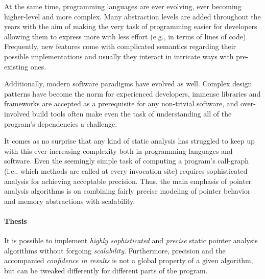 At the same time, programming languages are ever evolving, ever becoming higher-level and more complex. Many abstraction levels are added throughout the years with the aim of making the very task of programming easier for developers allowing them to express more with less effort (e.g., in terms of lines of code). Frequently, new features come with complicated semantics regarding their possible implementations and usually they interact in intricate ways with pre-existing ones.

Additionally, modern software paradigms have evolved as well. Complex design patterns have become the norm for experienced developers, immense libraries and frameworks are accepted as a prerequisite for any non-trivial software, and over-involved build tools often make even the task of understanding all of the program's dependencies a challenge.

It comes as no surprise that any kind of static analysis has struggled to keep up with this ever-increasing complexity both in programming languages and software. Even the seemingly simple task of computing a program's call-graph (i.e., which methods are called at every invocation site) requires sophisticated analysis for achieving acceptable precision. Thus, the main emphasis of pointer analysis algorithms is on combining fairly precise modeling of pointer behavior and memory abstractions with scalability.


\paragraph*{Thesis}
\begin{displayquote}
It is possible to implement \emph{highly sophisticated} and \emph{precise} static pointer analysis algorithms without forgoing \emph{scalability}. Furthermore, precision and the accompanied \emph{confidence in results} is not a global property of a given algorithm, but can be tweaked differently for different parts of the program.
\end{displayquote}

